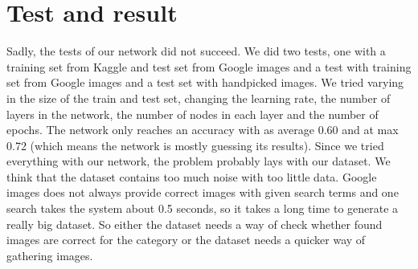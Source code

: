 \documentclass[fleqn,10pt]{SelfArx} %
\begin{document}
\section{Test and result}
Sadly, the tests of our network did not succeed. We did two tests, one with a training set from Kaggle and test set from Google images and a test with training set from Google images and a test set with handpicked images. We tried varying in the size of the train and test set, changing the learning rate, the number of layers in the network, the number of nodes in each layer and the number of epochs. The network only reaches an accuracy with as average 0.60 and at max 0.72 (which means the network is mostly guessing its results). Since we tried everything with our network, the problem probably lays with our dataset. We think that the dataset contains too much noise with too little data. Google images does not always provide correct images with given search terms and one search takes the system about 0.5 seconds, so it takes a long time to generate a really big dataset. So either the dataset needs a way of check whether found images are correct for the category or the dataset needs a quicker way of gathering images.






\end{document}

